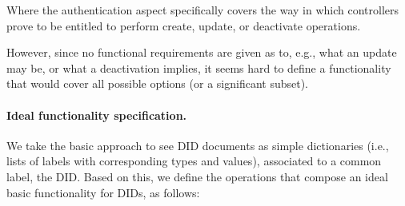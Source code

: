 Where the authentication aspect specifically covers the way in which controllers
prove to be entitled to perform create, update, or deactivate operations.

However, since no functional requirements are given as to, e.g., what an update
may be, or what a deactivation implies, it seems hard to define a functionality
that would cover all possible options (or a significant subset).

\paragraph{Ideal functionality specification.} %
We take the basic approach to see DID documents as simple dictionaries
(i.e., lists of labels with corresponding types and values), associated to a
common label, the DID. Based on this, we define the operations that compose an
ideal basic functionality for DIDs, as follows:

